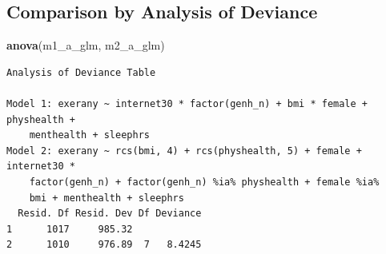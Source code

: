\documentclass[]{book}
\newenvironment{Shaded}{\begin{snugshade}}{\end{snugshade}}
\newcommand{\KeywordTok}[1]{\textcolor[rgb]{0.13,0.29,0.53}{\textbf{#1}}}
\newcommand{\DataTypeTok}[1]{\textcolor[rgb]{0.13,0.29,0.53}{#1}}
\newcommand{\DecValTok}[1]{\textcolor[rgb]{0.00,0.00,0.81}{#1}}
\newcommand{\StringTok}[1]{\textcolor[rgb]{0.31,0.60,0.02}{#1}}
\newcommand{\OperatorTok}[1]{\textcolor[rgb]{0.81,0.36,0.00}{\textbf{#1}}}
\newcommand{\NormalTok}[1]{#1}
\theoremstyle{definition}
\theoremstyle{definition}
\theoremstyle{definition}
\theoremstyle{remark}
\begin{document}
\begin{Shaded}
\end{Shaded}

\subsection{Comparison by Analysis of
Deviance}\label{comparison-by-analysis-of-deviance}

\begin{Shaded}
\begin{Highlighting}[]
\KeywordTok{anova}\NormalTok{(m1_a_glm, m2_a_glm)}
\end{Highlighting}
\end{Shaded}

\begin{verbatim}
Analysis of Deviance Table

Model 1: exerany ~ internet30 * factor(genh_n) + bmi * female + physhealth + 
    menthealth + sleephrs
Model 2: exerany ~ rcs(bmi, 4) + rcs(physhealth, 5) + female + internet30 * 
    factor(genh_n) + factor(genh_n) %ia% physhealth + female %ia% 
    bmi + menthealth + sleephrs
  Resid. Df Resid. Dev Df Deviance
1      1017     985.32            
2      1010     976.89  7   8.4245
\end{verbatim}
\end{document}
